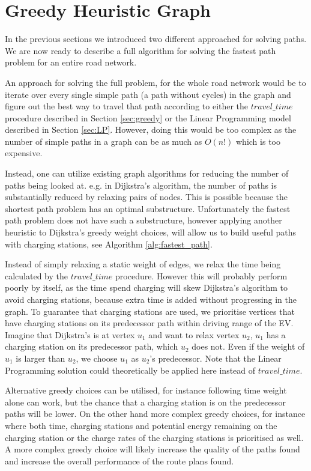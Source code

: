 \section{Greedy Heuristic Graph}\label{sec:algo}
In the previous sections we introduced two different approached for solving paths. We are now ready to describe a full algorithm for solving the fastest path problem for an entire road network. 

An approach for solving the full problem, for the whole road network would be to iterate over every single simple path (a path without cycles) in the graph and figure out the best way to travel that path according to either the $travel\_time$ procedure described in Section \ref{sec:greedy} or the Linear Programming model described in Section \ref{sec:LP}. However, doing this would be too complex as the number of simple paths in a graph can be as much as $O(n!)$ which is too expensive.

Instead, one can utilize existing graph algorithms for reducing the number of paths being looked at. e.g. in Dijkstra's algorithm, the number of paths is substantially reduced by relaxing pairs of nodes. This is possible because the shortest path problem has an optimal substructure. Unfortunately the fastest path problem does not have such a substructure, however applying another heuristic to Dijkstra's greedy weight choices, will allow us to build useful paths with charging stations, see Algorithm \ref{alg:fastest_path}.  

Instead of simply relaxing a static weight of edges, we relax the time being calculated by the $travel\_time$ procedure. However this will probably perform poorly by itself, as the time spend charging will skew Dijkstra's algorithm to avoid charging stations, because extra time is added without progressing in the graph. To guarantee that charging stations are used, we prioritise vertices that have charging stations on its predecessor path within driving range of the EV. Imagine that Dijkstra's is at vertex $u_1$ and want to relax vertex $u_2$, $u_1$ has a charging station on its predecessor path, which $u_2$ does not. Even if the weight of $u_1$ is larger than $u_2$, we choose $u_1$ as $u_2$'s predecessor. Note that the Linear Programming solution could theoretically be applied here instead of $travel\_time$.

Alternative greedy choices can be utilised, for instance following time weight alone can work, but the chance that a charging station is on the predecessor paths will be lower. On the other hand more complex greedy choices, for instance where both time, charging stations and potential energy remaining on the charging station or the charge rates of the charging stations is prioritised as well. A more complex greedy choice will likely increase the quality of the paths found and increase the overall performance of the route plans found.


